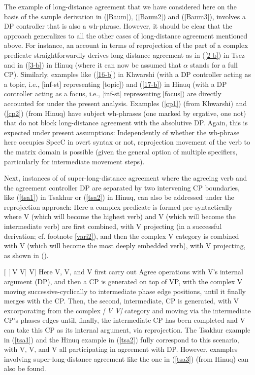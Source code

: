 \documentclass[output=paper
,modfonts
,nonflat]{langsci/langscibook}
\begin{document}
	The example of long-distance agreement that we have considered here on
	the basis of the sample derivation in (\ref{Baum}), (\ref{Baum2}) and
	(\ref{Baum3}), involves a DP controller that is also a
	wh-phrase. However, it should be clear that the approach generalizes
	to all the other cases of long-distance agreement mentioned
	above. For instance, an account in terms of reprojection of the part
	of a complex predicate straightforwardly derives long-distance
	agreement as in (\ref{2-b}) in Tsez and in (\ref{3-b}) in Hinuq (where it can
	now be assumed that $\alpha$ stands for a full CP). Similarly,
	examples like (\ref{16-b}) in Khwarshi (with a DP controller
	acting as a topic, i.e., [inf-st] representing [topic]) and (\ref{17-b})
	in Hinuq (with a DP controller acting as a focus, i.e., [inf-st]
	representing [focus]) are directly accounted for under the present
	analysis. Examples (\ref{cp1}) (from Khwarshi) and (\ref{cp2}) (from Hinuq) have
	subject wh-phrases (one marked by ergative, one not) that do not block
	long-distance agreement with the absolutive DP. Again, this is
	expected under present assumptions: Independently of whether the
	wh-phrase here occupies SpecC in overt syntax or not, reprojection
	movement of the verb to the matrix domain is possible (given the
	general option of multiple specifiers, particularly for intermediate
	movement steps). 
	
	Next, instances of of super-long-distance agreement where the
	agreeing verb and the agreement controller DP are separated by two
	intervening CP boundaries, like (\ref{tsa1}) in Tsakhur or (\ref{tsa2}) in
	Hinuq, can also be addressed under the reprojection approach: Here a complex
	predicate is formed pre-syntactically where V (which will become the
	highest verb) and V (which will become the intermediate verb) are
	first combined, with V projecting (in a successful derivation;
	cf. footnote \ref{vari2}), and then the complex V category is
	combined with V (which will become the most deeply embedded verb),
	with V projecting, as shown in (\Next).
	
	\ea\relax\label{ex:mueller:35} {[} [ V V] V]\z
	Here V, V, and V first carry out Agree operations with V's
	internal argument (DP), and then a CP is generated on top of
	VP, with the complex V moving successive-cyclically to
	intermediate phase edge positions, until it finally merges with the
	CP. Then, the second, intermediate, CP is generated, with V
	excorporating from the complex {\itshape [ V V]} category and
	moving via the intermediate CP's phases edges until, finally, the
	intermediate CP has been completed and V can take this CP as its
	internal argument, via reprojection. The Tsakhur example in (\ref{tsa1})
	and the Hinuq example in (\ref{tsa2}) 
	fully correspond to this scenario, with V, V, and V all
	participating in agreement with DP. However, examples
	involving super-long-distance agreement like the one in 
	(\ref{tsa3}) (from Hinuq) can also be found. 
	
\end{document}
